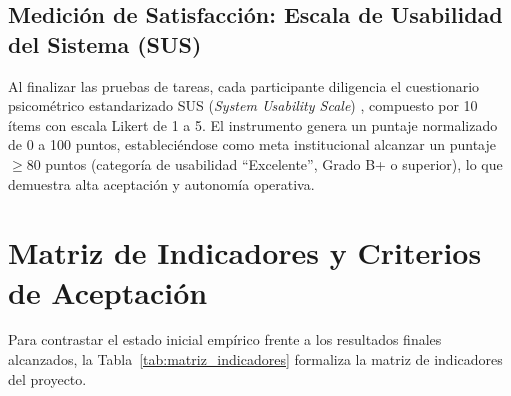 \subsection{Medición de Satisfacción: Escala de Usabilidad del Sistema (SUS)}
Al finalizar las pruebas de tareas, cada participante diligencia el cuestionario psicométrico estandarizado SUS (\textit{System Usability Scale}) \cite{brooke1996sus}, compuesto por 10 ítems con escala Likert de 1 a 5. El instrumento genera un puntaje normalizado de 0 a 100 puntos, estableciéndose como meta institucional alcanzar un puntaje $\ge 80$ puntos (categoría de usabilidad ``Excelente'', Grado B+ o superior), lo que demuestra alta aceptación y autonomía operativa.

\section{Matriz de Indicadores y Criterios de Aceptación}
Para contrastar el estado inicial empírico frente a los resultados finales alcanzados, la Tabla~\ref{tab:matriz_indicadores} formaliza la matriz de indicadores del proyecto.

